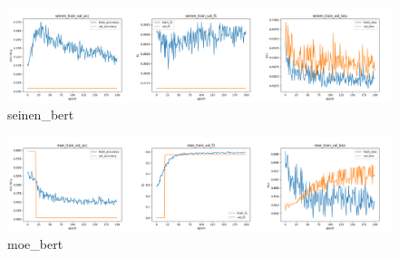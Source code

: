 \documentclass[twocolumn]{jarticle}     %
\begin{document}
\begin{figure}[h]
  \begin{center} %
    \includegraphics[width=14.0cm]{seinen_bert.png}
    \caption{seinen\_bert} %
    \label{fig:seinen_bert} %
  \end{center}
\end{figure}

\begin{figure}[h]
  \begin{center} %
    \includegraphics[width=14.0cm]{moe_bert.png}
    \caption{moe\_bert} %
    \label{fig:moe_bert} %
  \end{center}
\end{figure}
\clearpage
\end{document}
